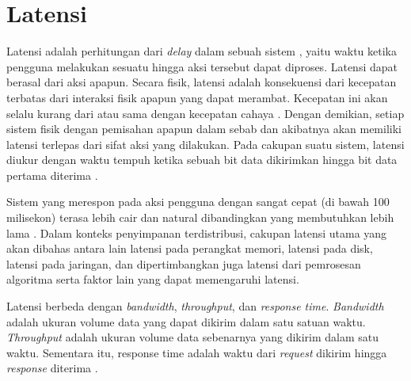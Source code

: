 \section{Latensi}
\label{sec:latensi}

Latensi adalah perhitungan dari \textit{delay} dalam sebuah sistem \parencite{goodwin2023latency}, yaitu waktu ketika pengguna melakukan sesuatu hingga aksi tersebut dapat diproses. Latensi dapat berasal dari aksi apapun. Secara fisik, latensi adalah konsekuensi dari kecepatan terbatas dari interaksi fisik apapun yang dapat merambat. Kecepatan ini akan selalu kurang dari atau sama dengan kecepatan cahaya \parencite{halliday2013fundamentals}. Dengan demikian, setiap sistem fisik dengan pemisahan apapun dalam sebab dan akibatnya akan memiliki latensi terlepas dari sifat aksi yang dilakukan. Pada cakupan suatu sistem, latensi diukur dengan waktu tempuh ketika sebuah bit data dikirimkan hingga bit data pertama diterima \parencite{johansson2000impact}.

Sistem yang merespon pada aksi pengguna dengan sangat cepat (di bawah 100 milisekon) terasa lebih cair dan natural dibandingkan yang membutuhkan lebih lama \parencite{dean2013tail}. Dalam konteks penyimpanan terdistribusi, cakupan latensi utama yang akan dibahas antara lain latensi pada perangkat memori, latensi pada disk, latensi pada jaringan, dan dipertimbangkan juga latensi dari pemrosesan algoritma serta faktor lain yang dapat memengaruhi latensi.

Latensi berbeda dengan \textit{bandwidth}, \textit{throughput}, dan \textit{response time}. \textit{Bandwidth} adalah ukuran volume data yang dapat dikirim dalam satu satuan waktu. \textit{Throughput} adalah ukuran volume data sebenarnya yang dikirim dalam satu waktu. Sementara itu, response time adalah waktu dari \textit{request} dikirim hingga \textit{response} diterima \parencite{goodwin2023latency}.




% 
